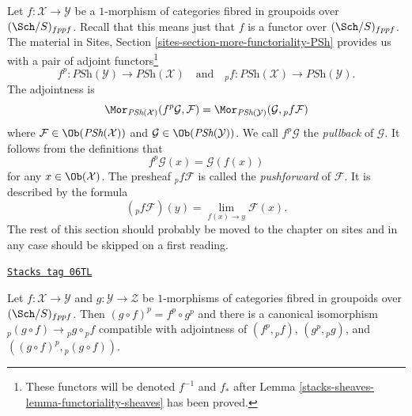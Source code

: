 \medskip\noindent
Let $f : \mathcal{X} \to \mathcal{Y}$ be a $1$-morphism of categories
fibred in groupoids over $(\Sch/S)_{fppf}$. Recall that this
means just that $f$ is a functor over $(\Sch/S)_{fppf}$.
The material in
Sites, Section \ref{sites-section-more-functoriality-PSh}
provides us with a pair of adjoint functors\footnote{These functors
will be denoted $f^{-1}$ and $f_*$ after
Lemma \ref{stacks-sheaves-lemma-functoriality-sheaves}
has been proved.}
\begin{equation}
\label{equation-pushforward-pullback}
f^p : \textit{PSh}(\mathcal{Y}) \longrightarrow \textit{PSh}(\mathcal{X})
\quad\text{and}\quad
{}_pf : \textit{PSh}(\mathcal{X}) \longrightarrow \textit{PSh}(\mathcal{Y}).
\end{equation}
The adjointness is
$$
\Mor_{\textit{PSh}(\mathcal{X})}(f^p\mathcal{G}, \mathcal{F})
=
\Mor_{\textit{PSh}(\mathcal{Y})}(\mathcal{G}, {}_pf\mathcal{F})
$$
where $\mathcal{F} \in \Ob(\textit{PSh}(\mathcal{X}))$ and
$\mathcal{G} \in \Ob(\textit{PSh}(\mathcal{Y}))$. We call
$f^p\mathcal{G}$ the {\it pullback} of $\mathcal{G}$. It follows
from the definitions that
$$
f^p\mathcal{G}(x) = \mathcal{G}(f(x))
$$
for any $x \in \Ob(\mathcal{X})$. The presheaf ${}_pf\mathcal{F}$
is called the {\it pushforward} of $\mathcal{F}$. It is described
by the formula
$$
({}_pf\mathcal{F})(y) = \lim_{f(x) \to y} \mathcal{F}(x).
$$
The rest of this section should probably be moved to the chapter
on sites and in any case should be skipped on a first reading.

\begin{lemma}
\label{stacks-sheaves-lemma-1-morphisms-presheaves}
\href{https://stacks.math.columbia.edu/tag/06TL}{\texttt{Stacks tag 06TL}}

Let $f : \mathcal{X} \to \mathcal{Y}$ and $g : \mathcal{Y} \to \mathcal{Z}$
be $1$-morphisms of categories fibred in groupoids over
$(\Sch/S)_{fppf}$. Then $(g \circ f)^p = f^p \circ g^p$ and
there is a canonical isomorphism
${}_p(g \circ f) \to {}_pg \circ {}_pf$
compatible with adjointness of $(f^p, {}_pf)$, $(g^p, {}_pg)$, and
$((g \circ f)^p, {}_p(g \circ f))$.
\end{lemma}

